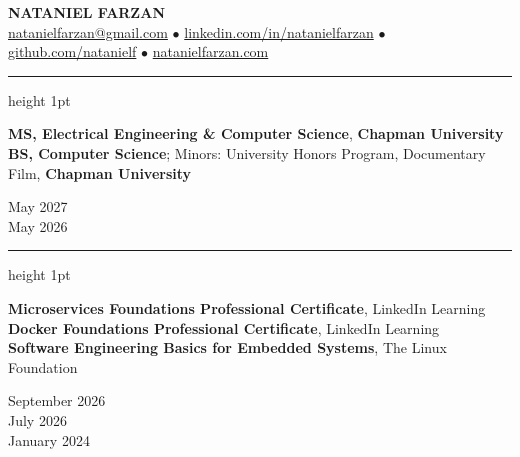 \documentclass[letter]{article}
\begin{document}
    \begin{center}
        {\huge \textbf{\uppercase{Nataniel Farzan}}} \\
        \href{mailto:natanielfarzan@gmail.com}{natanielfarzan@gmail.com} $\bullet$
        \href{https://www.linkedin.com/in/natanielfarzan}{linkedin.com/in/natanielfarzan} $\bullet$
        \href{https://github.com/natanielf}{github.com/natanielf} $\bullet$
        \href{https://natanielfarzan.com/}{natanielfarzan.com}
    \end{center}

    \vspace{4pt}
    \hrule height 1pt
    \vspace{4pt}
    \noindent
    \begin{minipage}[c]{0.89\linewidth}
        \noindent \textbf{MS, Electrical Engineering \& Computer Science}, \textbf{Chapman University} \\
        \noindent \textbf{BS, Computer Science}; Minors: University Honors Program, Documentary Film, \textbf{Chapman University} \\
    \end{minipage}
    \begin{minipage}[c]{0.105\linewidth}
        \vspace*{-\baselineskip}
        \begin{flushright}
            May 2027 \\
            May 2026 \\
        \end{flushright}
    \end{minipage}

    \vspace{4pt}
    \hrule height 1pt
    \vspace{4pt}
    \noindent
    \begin{minipage}[c]{0.7\linewidth}
        \noindent \textbf{Microservices Foundations Professional Certificate}, LinkedIn Learning \\
        \noindent \textbf{Docker Foundations Professional Certificate}, LinkedIn Learning \\
        \noindent \textbf{Software Engineering Basics for Embedded Systems}, The Linux Foundation \\
    \end{minipage}
    \begin{minipage}[c]{0.295\linewidth}
        \vspace*{-\baselineskip}
        \begin{flushright}
            September 2026 \\
            July 2026 \\
            January 2024 \\
        \end{flushright}
    \end{minipage}
\end{document}
